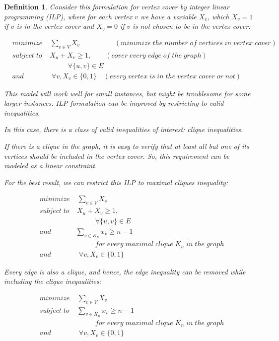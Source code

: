 \documentclass[12pt]{article}
\theoremstyle{slplain}
\newtheorem{defi}{Definition}[section]
\begin{document}
\begin{defi}
Consider this formulation for vertex cover by integer linear programming (ILP), where for each vertex $v$ we have a variable $X_v$, which $X_v = 1$ if $v$ is in the vertex cover and $X_v = 0$ if $v$ is not chosen to be in the vertex cover:

\begin{align*}
&minimize \; \;\; \; \sum_{v\in V}X_v \qquad\qquad\quad (minimize \; the \; number \;  of \;  vertices \; in \; vertex \; cover)\\
&subject\; to \;\;\; \; X_u + X_v  \geq 1 , \qquad (cover \; every \; edge \; of \; the \; graph)\\
&\qquad 	\qquad\qquad\qquad	 \forall \{u,v\} \in E\\
&and	\qquad\qquad	 \forall v, X_v\in \{0,1\} \quad (every \; vertex \; is \; in \; the \; vertex \; cover \; or \; not)
\end{align*}

This model will work well for small instances, but might be troublesome for some larger instances. ILP formulation can be improved  by restricting to valid inequalities.\cite{Gerard2} 

In this case, there is a class of valid inequalities of interest: clique inequalities.

If there is a clique in the graph, it is easy to verify that at least all but one
of its vertices should be included in the vertex cover. So, this requirement can be modeled as a linear constraint.

For the best result, we can restrict this ILP to maximal cliques inequality:


\begin{align*}
&minimize \; \;\; \; \sum_{v\in V}X_v\\
&subject\; to \;\;\; \; X_u + X_v  \geq 1 ,\\
&\qquad 	\qquad\qquad\qquad	 \forall \{u,v\} \in E\\
&and	\qquad\quad\;\; \sum_{v\in K_n}x_v \geq n - 1\\
& \qquad\qquad \qquad\qquad for\; every\; maximal\; clique\; K_n\; in\; the\; graph\\
&and	\qquad\qquad	 \forall v, X_v\in \{0,1\}
\end{align*}

Every edge is also a clique, and hence, the edge inequality can be removed
while including the clique inequalities:


\begin{align*}
&minimize \; \;\; \; \sum_{v\in V}X_v\\
&subject\; to \;\;\; \; \sum_{v\in K_n}x_v \geq n - 1\\
& \qquad\qquad \qquad\qquad for\; every\; maximal\; clique\; K_n\; in\; the\; graph\\
&and	\qquad\qquad	 \forall v, X_v\in \{0,1\}
\end{align*}


\end{defi}
\end{document}
